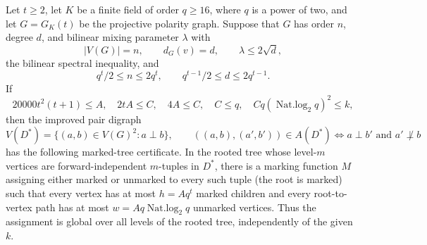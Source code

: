 \begin{lemma}
Let $t\geq2$, let $K$ be a finite field of order $q\geq16$, where $q$ is a
power of two, and let $G=G_K(t)$ be the projective polarity graph.  Suppose
that $G$ has order $n$, degree $d$, and bilinear mixing parameter $\lambda$
with
\[
 |V(G)|=n,\qquad d_G(v)=d,\qquad \lambda\leq2\sqrt d,
\]
the bilinear spectral inequality, and
\[
 q^t/2\leq n\leq2q^t,\qquad q^{t-1}/2\leq d\leq2q^{t-1}.
\]
If
\[
20000t^2(t+1)\leq A,\quad 2tA\leq C,\quad4A\leq C,
\quad C\leq q,
\quad Cq(\operatorname{Nat.log}_2q)^2\leq k,
\]
then the improved pair digraph
\[
 V(D^*)=\{(a,b)\in V(G)^2:a\perp b\},\qquad
 ((a,b),(a',b'))\in A(D^*)
 \Longleftrightarrow a\perp b'\text{ and }a'\not\perp b
\]
has the following marked-tree certificate.  In the rooted tree whose level-$m$
vertices are forward-independent $m$-tuples in $D^*$, there is a marking
function $M$ assigning either marked or unmarked to every such tuple (the
root is marked) such that every vertex has at most $h=Aq^t$ marked children and
every root-to-vertex path has at most $w=Aq\operatorname{Nat.log}_2q$
unmarked vertices.  Thus the assignment is global over all levels of the
rooted tree, independently of the given $k$.
\end{lemma}
